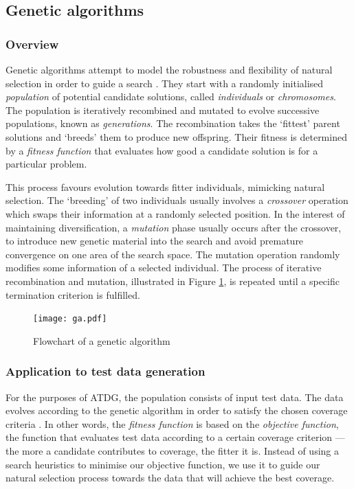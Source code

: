 \documentclass[a4paper,11pt,titlepage]{report}
\begin{document}
\subsection{Genetic algorithms}

\subsubsection{Overview}
Genetic algorithms attempt to model the robustness and flexibility of natural selection in order to guide a search \cite{michael2001generating}. They start with a randomly initialised \emph{population} of potential candidate solutions, called \emph{individuals} or \emph{chromosomes}. The population is iteratively recombined and mutated to evolve successive populations, known as \emph{generations}. The recombination takes the `fittest' parent solutions and `breeds' them to produce new offspring. Their fitness is determined by a \emph{fitness function} that evaluates how good a candidate solution is for a particular problem.

This process favours evolution towards fitter individuals, mimicking natural selection. The `breeding' of two individuals usually involves a \emph{crossover} operation which swaps their information at a randomly selected position. In the interest of maintaining diversification, a \emph{mutation} phase usually occurs after the crossover, to introduce new genetic material into the search and avoid premature convergence on one area of the search space. The mutation operation randomly modifies some information of a selected individual. The process of iterative recombination and mutation, illustrated in Figure \ref{ga}, is repeated until a specific termination criterion is fulfilled.

\begin{figure}
\hspace*{0.7cm}
\centering
\texttt{[image: ga.pdf]}
\caption{Flowchart of a genetic algorithm}
\label{ga}
\end{figure}

\subsubsection{Application to test data generation}
\label{subsubsec:ga_application}
For the purposes of ATDG, the population consists of input test data. The data evolves according to the genetic algorithm in order to satisfy the chosen coverage criteria \cite{michael2001generating}. In other words, the \emph{fitness function} is based on the \emph{objective function}, the function that evaluates test data according to a certain coverage criterion --- the more a candidate contributes to coverage, the fitter it is. Instead of using a search heuristics to minimise our objective function, we use it to guide our natural selection process towards the data that will achieve the best coverage.
\end{document}
